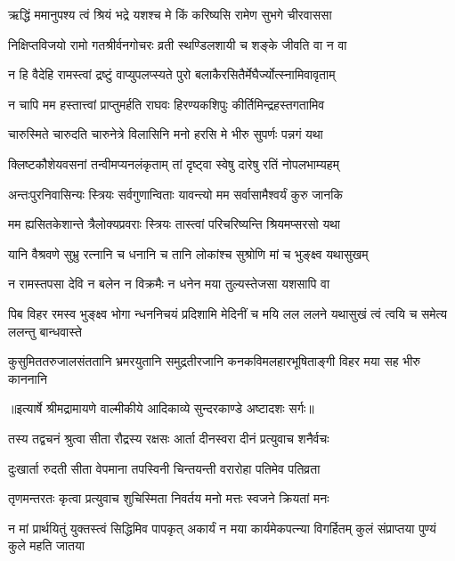 \twolineshloka
{ऋद्धिं ममानुपश्य त्वं श्रियं भद्रे यशश्च मे}
{किं करिष्यसि रामेण सुभगे चीरवाससा} %

\twolineshloka
{निक्षिप्तविजयो रामो गतश्रीर्वनगोचरः}
{व्रती स्थण्डिलशायी च शङ्के जीवति वा न वा} %

\twolineshloka
{न हि वैदेहि रामस्त्वां द्रष्टुं वाप्युपलप्स्यते}
{पुरो बलाकैरसितैर्मेघैर्ज्योत्स्नामिवावृताम्} %

\twolineshloka
{न चापि मम हस्तात्त्वां प्राप्तुमर्हति राघवः}
{हिरण्यकशिपुः कीर्तिमिन्द्रहस्तगतामिव} %

\twolineshloka
{चारुस्मिते चारुदति चारुनेत्रे विलासिनि}
{मनो हरसि मे भीरु सुपर्णः पन्नगं यथा} %

\twolineshloka
{क्लिष्टकौशेयवसनां तन्वीमप्यनलंकृताम्}
{तां दृष्ट्वा स्वेषु दारेषु रतिं नोपलभाम्यहम्} %

\twolineshloka
{अन्तःपुरनिवासिन्यः स्त्रियः सर्वगुणान्विताः}
{यावन्त्यो मम सर्वासामैश्वर्यं कुरु जानकि} %

\twolineshloka
{मम ह्यसितकेशान्ते त्रैलोक्यप्रवराः स्त्रियः}
{तास्त्वां परिचरिष्यन्ति श्रियमप्सरसो यथा} %

\twolineshloka
{यानि वैश्रवणे सुभ्रु रत्नानि च धनानि च}
{तानि लोकांश्च सुश्रोणि मां च भुङ्क्ष्व यथासुखम्} %

\twolineshloka
{न रामस्तपसा देवि न बलेन न विक्रमैः}
{न धनेन मया तुल्यस्तेजसा यशसापि वा} %

\fourlineindentedshloka
{पिब विहर रमस्व भुङ्क्ष्व भोगा}
{न्धननिचयं प्रदिशामि मेदिनीं च}
{मयि लल ललने यथासुखं त्वं}
{ त्वयि च समेत्य ललन्तु बान्धवास्ते} %

\fourlineindentedshloka
{कुसुमिततरुजालसंततानि}
{ भ्रमरयुतानि समुद्रतीरजानि}
{कनकविमलहारभूषिताङ्गी}
{ विहर मया सह भीरु काननानि} %


{॥इत्यार्षे श्रीमद्रामायणे वाल्मीकीये आदिकाव्ये सुन्दरकाण्डे अष्टादशः सर्गः॥}


\twolineshloka
{तस्य तद्वचनं श्रुत्वा सीता रौद्रस्य रक्षसः}
{आर्ता दीनस्वरा दीनं प्रत्युवाच शनैर्वचः} %

\twolineshloka
{दुःखार्ता रुदती सीता वेपमाना तपस्विनी}
{चिन्तयन्ती वरारोहा पतिमेव पतिव्रता} %

\twolineshloka
{तृणमन्तरतः कृत्वा प्रत्युवाच शुचिस्मिता}
{निवर्तय मनो मत्तः स्वजने क्रियतां मनः} %

\threelineshloka
{न मां प्रार्थयितुं युक्तस्त्वं सिद्धिमिव पापकृत्}
{अकार्यं न मया कार्यमेकपत्न्या विगर्हितम्}
{कुलं संप्राप्तया पुण्यं कुले महति जातया} %

